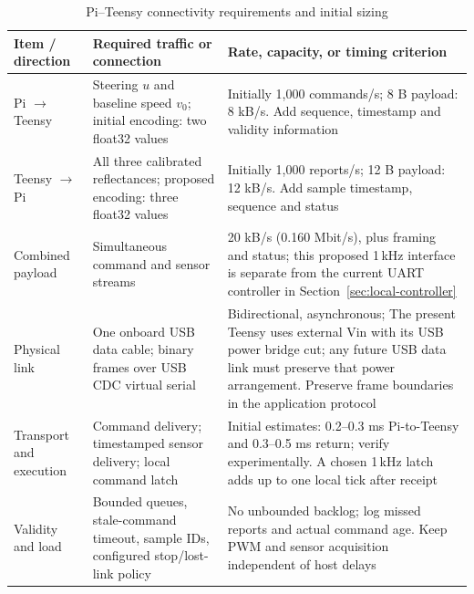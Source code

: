 \begin{table}[H]
\centering\small
\caption{Pi--Teensy connectivity requirements and initial sizing}
\label{tab:pi-teensy}
\begin{tabular}{@{}L{3.0cm}L{6.2cm}L{7.3cm}@{}}
\toprule
\textbf{Item / direction} & \textbf{Required traffic or connection} & \textbf{Rate, capacity, or timing criterion} \\
\midrule
Pi $\to$ Teensy & Steering $u$ and baseline speed $v_0$; initial encoding: two float32 values & Initially 1,000 commands/s; 8 B payload: 8 kB/s. Add sequence, timestamp and validity information \\
Teensy $\to$ Pi & All three calibrated reflectances; proposed encoding: three float32 values & Initially 1,000 reports/s; 12 B payload: 12 kB/s. Add sample timestamp, sequence and status \\
Combined payload & Simultaneous command and sensor streams & 20 kB/s (0.160 Mbit/s), plus framing and status; this proposed 1\,kHz interface is separate from the current UART controller in Section~\ref{sec:local-controller} \\
Physical link & One onboard USB data cable; binary frames over USB CDC virtual serial & Bidirectional, asynchronous; The present Teensy uses external Vin with its USB power bridge cut; any future USB data link must preserve that power arrangement. Preserve frame boundaries in the application protocol \\
Transport and execution & Command delivery; timestamped sensor delivery; local command latch & Initial estimates: 0.2--0.3 ms Pi-to-Teensy and 0.3--0.5 ms return; verify experimentally. A chosen 1\,kHz latch adds up to one local tick after receipt \\
Validity and load & Bounded queues, stale-command timeout, sample IDs, configured stop/lost-link policy & No unbounded backlog; log missed reports and actual command age. Keep PWM and sensor acquisition independent of host delays \\
\bottomrule
\end{tabular}
\end{table}

